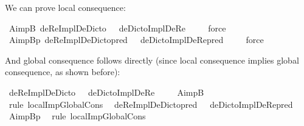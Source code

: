 \begin{isabellebody}
\begin{isamarkuptext}%
We can prove local consequence:%
\end{isamarkuptext}\isamarkuptrue%
\isamarkupfalse%
\ AimpB{\isacharcolon}\ {\isachardoublequoteopen}{\isasymlfloor}deReImplDeDicto\ {\isacharparenleft}{\isasymtau}{\isacharcolon}{\isacharcolon}{\isasymup}{\isasymzero}{\isacharparenright}\ \isactrlbold {\isasymrightarrow}\ deDictoImplDeRe\ {\isasymtau}{\isasymrfloor}{\isachardoublequoteclose}\isanewline
%
\ \ %
%
\isamarkupfalse%
\ force\ %
%
%
\isanewline
%
\isamarkupfalse%
\ AimpB{\isacharunderscore}p{\isacharcolon}\ {\isachardoublequoteopen}{\isasymlfloor}deReImplDeDicto{\isacharunderscore}pred\ {\isacharparenleft}{\isasymtau}{\isacharcolon}{\isacharcolon}{\isasymup}{\isasymlangle}{\isasymzero}{\isasymrangle}{\isacharparenright}\ \isactrlbold {\isasymrightarrow}\ deDictoImplDeRe{\isacharunderscore}pred\ {\isasymtau}{\isasymrfloor}{\isachardoublequoteclose}\isanewline
%
\ \ %
%
\isamarkupfalse%
\ force\ %
%
%
%
%
\begin{isamarkuptext}%
And global consequence follows directly (since local consequence implies global consequence, as shown before):%
\end{isamarkuptext}\isamarkuptrue%
\isamarkupfalse%
\ {\isachardoublequoteopen}{\isasymlfloor}deReImplDeDicto\ {\isacharparenleft}{\isasymtau}{\isacharcolon}{\isacharcolon}{\isasymup}{\isasymzero}{\isacharparenright}{\isasymrfloor}\ {\isasymlongrightarrow}\ {\isasymlfloor}deDictoImplDeRe\ {\isasymtau}{\isasymrfloor}{\isachardoublequoteclose}\isanewline
%
\ \ %
%
\isamarkupfalse%
\ AimpB\ \isamarkupfalse%
\ {\isacharparenleft}rule\ localImpGlobalCons{\isacharparenright}\ %
%
%
\isanewline
%
\isamarkupfalse%
\ {\isachardoublequoteopen}{\isasymlfloor}deReImplDeDicto{\isacharunderscore}pred\ {\isacharparenleft}{\isasymtau}{\isacharcolon}{\isacharcolon}{\isasymup}{\isasymlangle}{\isasymzero}{\isasymrangle}{\isacharparenright}{\isasymrfloor}\ {\isasymlongrightarrow}\ {\isasymlfloor}deDictoImplDeRe{\isacharunderscore}pred\ {\isasymtau}{\isasymrfloor}{\isachardoublequoteclose}\isanewline
%
\ \ %
%
\isamarkupfalse%
\ AimpB{\isacharunderscore}p\ \isamarkupfalse%
\ {\isacharparenleft}rule\ localImpGlobalCons{\isacharparenright}\ %
%
%
%
%
\end{isabellebody}
